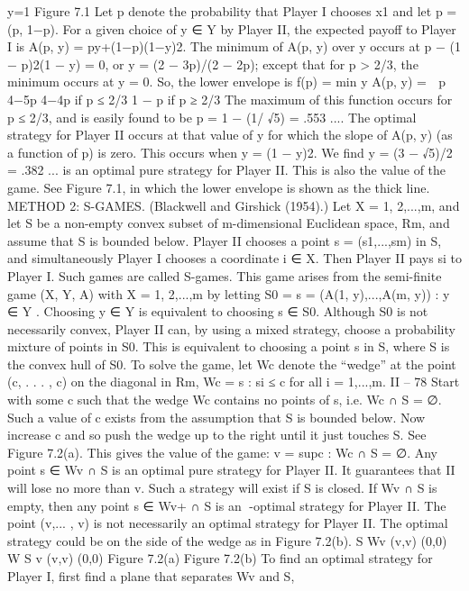 y=1
Figure 7.1
Let p denote the probability that Player I chooses x1 and let p = (p, 1−p). For a given
choice of y ∈ Y by Player II, the expected payoff to Player I is A(p, y) = py+(1−p)(1−y)2.
The minimum of A(p, y) over y occurs at p − (1 − p)2(1 − y) = 0, or y = (2 − 3p)/(2 − 2p);
except that for p > 2/3, the minimum occurs at y = 0. So, the lower envelope is
f(p) = min
y
A(p, y) =  p 4−5p
4−4p
if p ≤ 2/3
1 − p if p ≥ 2/3
The maximum of this function occurs for p ≤ 2/3, and is easily found to be p = 1 −
(1/
√5) = .553 .... The optimal strategy for Player II occurs at that value of y for which
the slope of A(p, y) (as a function of p) is zero. This occurs when y = (1 − y)2. We find
y = (3 − √5)/2 = .382 ... is an optimal pure strategy for Player II. This is also the value
of the game. See Figure 7.1, in which the lower envelope is shown as the thick line.
METHOD 2: S-GAMES. (Blackwell and Girshick (1954).) Let X = {1, 2,...,m},
and let S be a non-empty convex subset of m-dimensional Euclidean space, Rm, and
assume that S is bounded below. Player II chooses a point s = (s1,...,sm) in S, and
simultaneously Player I chooses a coordinate i ∈ X. Then Player II pays si to Player I.
Such games are called S-games.
This game arises from the semi-finite game (X, Y, A) with X = {1, 2,...,m} by letting
S0 = {s = (A(1, y),...,A(m, y)) : y ∈ Y }. Choosing y ∈ Y is equivalent to choosing
s ∈ S0. Although S0 is not necessarily convex, Player II can, by using a mixed strategy,
choose a probability mixture of points in S0. This is equivalent to choosing a point s in
S, where S is the convex hull of S0.
To solve the game, let Wc denote the “wedge” at the point (c, . . . , c) on the diagonal
in Rm,
Wc = {s : si ≤ c for all i = 1,...,m}.
II – 78
Start with some c such that the wedge Wc contains no points of s, i.e. Wc ∩ S = ∅. Such
a value of c exists from the assumption that S is bounded below. Now increase c and so
push the wedge up to the right until it just touches S. See Figure 7.2(a). This gives the
value of the game:
v = sup{c : Wc ∩ S = ∅}.
Any point s ∈ Wv ∩ S is an optimal pure strategy for Player II. It guarantees that II will
lose no more than v. Such a strategy will exist if S is closed. If Wv ∩ S is empty, then
any point s ∈ Wv+ ∩ S is an -optimal strategy for Player II. The point (v,... , v) is not
necessarily an optimal strategy for Player II. The optimal strategy could be on the side of
the wedge as in Figure 7.2(b).
S
Wv
(v,v)
(0,0)
W S v
(v,v)
(0,0)
Figure 7.2(a) Figure 7.2(b)
To find an optimal strategy for Player I, first find a plane that separates Wv and S,
